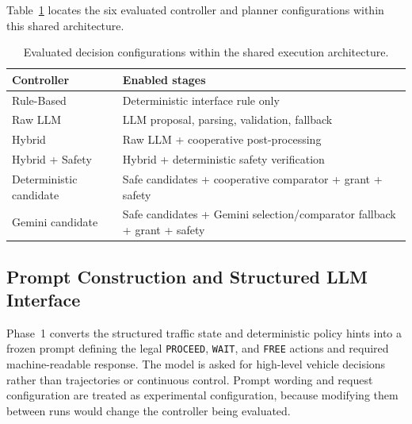 \documentclass[letterpaper,10pt,conference]{ieeeconf}
\begin{document}
Table~\ref{tab:controllers} locates the six evaluated controller and planner configurations within this shared architecture.

\begin{table}[t]

\centering

\caption{Evaluated decision configurations within the shared execution architecture.}

\label{tab:controllers}

\renewcommand{\arraystretch}{1.08}

\begin{tabular}{p{1.75cm} p{3.5cm}}

\toprule

\textbf{Controller} & \textbf{Enabled stages} \\

\midrule

Rule-Based & Deterministic interface rule only \\

Raw LLM & LLM proposal, parsing, validation, fallback \\

Hybrid & Raw LLM + cooperative post-processing \\

Hybrid + Safety & Hybrid + deterministic safety verification \\

Deterministic candidate & Safe candidates + cooperative comparator + grant + safety \\

Gemini candidate & Safe candidates + Gemini selection/comparator fallback + grant + safety \\

\bottomrule

\end{tabular}

\end{table}



\subsection{Prompt Construction and Structured LLM Interface}



Phase~1 converts the structured traffic state and deterministic policy hints into a frozen prompt defining the legal \texttt{PROCEED}, \texttt{WAIT}, and \texttt{FREE} actions and required machine-readable response. The model is asked for high-level vehicle decisions rather than trajectories or continuous control. Prompt wording and request configuration are treated as experimental configuration, because modifying them between runs would change the controller being evaluated.
\end{document}
